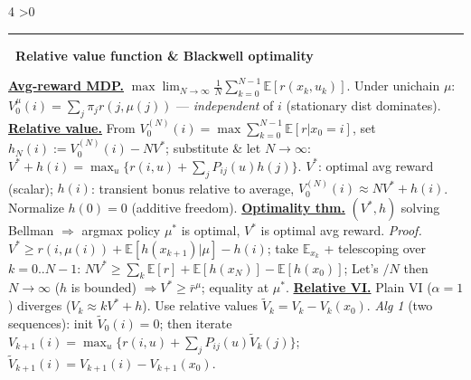 \documentclass[10pt,landscape,letterpaper]{article}
\let\oldtextbf\textbf
\renewcommand{\textbf}[1]{\uline{\oldtextbf{#1}}}
\renewcommand{\section}[1]{%
  \ifnum\value{section}>0\par\vspace{1pt}\hrule\vspace{1pt}\fi
  \refstepcounter{section}\oldtextbf{\thesection\ #1}\ }
\begin{document}
\begin{multicols*}{4}
\section{Relative value function \& Blackwell optimality}

\textbf{Avg-reward MDP.} \(\max\lim_{N\to\infty}\tfrac{1}{N}\!\sum_{k=0}^{N-1}\!\mathbb E[r(x_k,u_k)]\). Under unichain \(\mu\): \(V^\mu_0(i){=}\!\sum_j\!\pi_j r(j,\mu(j))\) — \emph{independent} of \(i\) (stationary dist dominates).
\textbf{Relative value.} From \(V^{(N)}_0(i){=}\max\!\sum_{k=0}^{N-1}\!\mathbb E[r|x_0{=}i]\), set \(h_N(i){:=}V^{(N)}_0(i){-}NV^*\); substitute \& let \(N{\to}\infty\):
\(V^*{+}h(i){=}\max_u\{r(i,u)+\!\sum_j\!P_{ij}(u)h(j)\}\).
\(V^*\): optimal avg reward (scalar); \(h(i)\): transient bonus relative to average, \(V^{(N)}_0(i)\!\approx\!NV^*{+}h(i)\). Normalize \(h(0){=}0\) (additive freedom).
\textbf{Optimality thm.} \((V^*,h)\) solving Bellman \(\Rightarrow\) argmax policy \(\mu^*\) is optimal, \(V^*\) is optimal avg reward.
\emph{Proof.} \(V^*\ge r(i,\mu(i)){+}\mathbb E[h(x_{k+1})|\mu]{-}h(i)\);
take \(\mathbb E_{x_k}\) + telescoping over \(k{=}0..N{-}1\):
\(NV^*\ge\!\sum_k\!\mathbb E[r]{+}\mathbb E[h(x_N)]{-}\mathbb E[h(x_0)]\);
Let's \(/N\) then \(N{\to}\infty\) (\(h\) is bounded) \(\Rightarrow V^*\ge\bar r^\mu\); equality at \(\mu^*\).
\textbf{Relative VI.} Plain VI (\(\alpha{=}1\)) diverges (\(V_k\approx kV^*{+}h\)). Use relative values \(\tilde V_k{=}V_k{-}V_k(x_0)\).
\emph{Alg 1} (two sequences): init \(\tilde V_0(i){=}0\); then iterate
\(V_{k+1}(i){=}\max_u\{r(i,u){+}\!\sum_j\!P_{ij}(u)\tilde V_k(j)\}\); \(\tilde V_{k+1}(i){=}V_{k+1}(i){-}V_{k+1}(x_0)\).


\end{multicols*}
\end{document}
